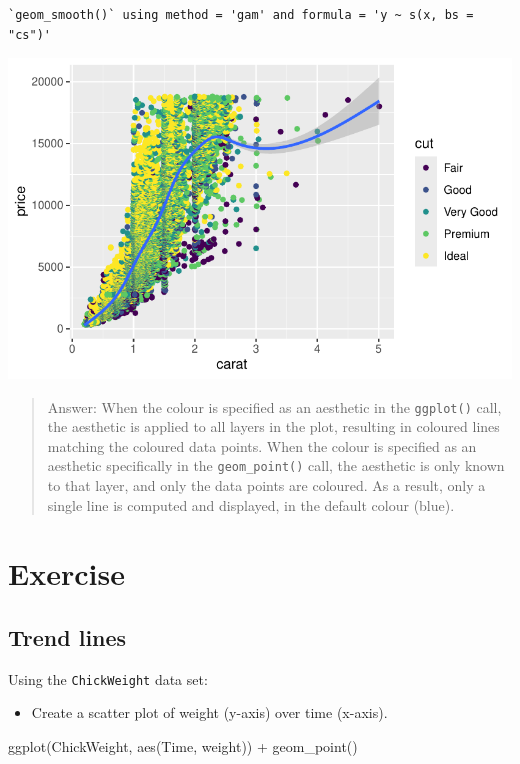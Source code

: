 \documentclass[
  letterpaper,
  DIV=11,
  numbers=noendperiod]{scrartcl}
\newenvironment{Shaded}{\begin{snugshade}}{\end{snugshade}}
\newcommand{\FunctionTok}[1]{\textcolor[rgb]{0.28,0.35,0.67}{#1}}
\newcommand{\NormalTok}[1]{\textcolor[rgb]{0.00,0.23,0.31}{#1}}
\newcommand{\SpecialCharTok}[1]{\textcolor[rgb]{0.37,0.37,0.37}{#1}}
\providecommand{\tightlist}{%
  \setlength{\itemsep}{0pt}\setlength{\parskip}{0pt}}\usepackage{longtable,booktabs,array}
\begin{document}
\begin{verbatim}
`geom_smooth()` using method = 'gam' and formula = 'y ~ s(x, bs = "cs")'
\end{verbatim}

\includegraphics{5-ggplot2_kevin_files/figure-pdf/unnamed-chunk-10-1.pdf}

\begin{quote}
Answer: When the colour is specified as an aesthetic in the
\texttt{ggplot()} call, the aesthetic is applied to all layers in the
plot, resulting in coloured lines matching the coloured data points.
When the colour is specified as an aesthetic specifically in the
\texttt{geom\_point()} call, the aesthetic is only known to that layer,
and only the data points are coloured. As a result, only a single line
is computed and displayed, in the default colour (blue).
\end{quote}

\section{Exercise}\label{exercise-2}

\subsection{Trend lines}\label{trend-lines}

Using the \texttt{ChickWeight} data set:

\begin{itemize}
\tightlist
\item
  Create a scatter plot of weight (y-axis) over time (x-axis).
\end{itemize}

\begin{Shaded}
\begin{Highlighting}[]
\FunctionTok{ggplot}\NormalTok{(ChickWeight, }\FunctionTok{aes}\NormalTok{(Time, weight)) }\SpecialCharTok{+}
  \FunctionTok{geom\_point}\NormalTok{()}
\end{Highlighting}
\end{Shaded}
\end{document}

